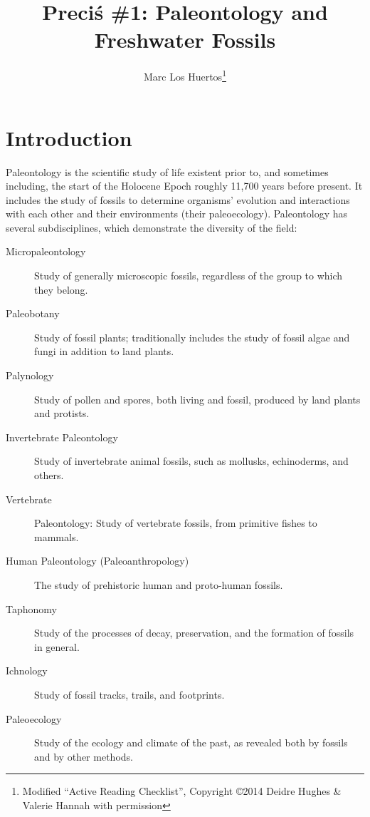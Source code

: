 \documentclass{tufte-handout}\usepackage[]{graphicx}\usepackage[]{color}
\title{Preci\'s \#1: Paleontology and Freshwater Fossils}
\author[Marc Los Huertos]{Marc Los Huertos\thanks{Modified ``Active Reading Checklist'', Copyright \copyright 2014 Deidre Hughes \& Valerie Hannah with permission}}
\begin{document}
\maketitle

\section{Introduction}

Paleontology is the scientific study of life existent prior to, and sometimes including, the start of the Holocene Epoch roughly 11,700 years before present. It includes the study of fossils to determine organisms' evolution and interactions with each other and their environments (their paleoecology). Paleontology has several subdisciplines, which demonstrate the diversity of the field:

\begin{description}
	\item[Micropaleontology] Study of generally microscopic fossils, regardless of the group to which they belong.
	\item[Paleobotany] Study of fossil plants; traditionally includes the study of fossil algae and fungi in addition to land plants.

\item[Palynology] Study of pollen and spores, both living and fossil, produced by land plants and protists.

\item [Invertebrate Paleontology] Study of invertebrate animal fossils, such as mollusks, echinoderms, and others.

\item[Vertebrate] Paleontology: Study of vertebrate fossils, from primitive fishes to mammals.

\item[Human Paleontology (Paleoanthropology)] The study of prehistoric human and proto-human fossils.

\item[Taphonomy] Study of the processes of decay, preservation, and the formation of fossils in general.

\item[Ichnology] Study of fossil tracks, trails, and footprints.

\item[Paleoecology] Study of the ecology and climate of the past, as revealed both by fossils and by other methods.
\end{description}
\end{document}
